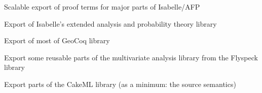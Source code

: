\begin{workpackage}[id=libraries,type=RTD,wphases=1-48,
  short={Large libraries},%
  title={Large libraries},
  lead=Tum,
  StrRM=18,
  ChaRM=12,
  TumRM=27]
\begin{tasklist}
\end{tasklist}

\begin{wpdelivs}
  \begin{wpdeliv}[due=36,id=exportafp,dissem=PU,nature=DEM,lead=Tum]
      {Scalable export of proof terms for major parts of Isabelle/AFP}
  \end{wpdeliv}
  \begin{wpdeliv}[due=36,id=exportanalysis,dissem=PU,nature=DEM,lead=Tum]
      {Export of Isabelle's extended analysis and probability theory library}
  \end{wpdeliv}
  \begin{wpdeliv}[due=18,id=geocoq-import,dissem=PU,nature=OTH,lead=Str]
      {Export of most of GeoCoq library}
  \end{wpdeliv}
  \begin{wpdeliv}[due=36,id=flyspec,dissem=PU,nature=OTH,lead=Inr]
      {Export some reusable parts of the multivariate analysis library from the Flyspeck library}
  \end{wpdeliv}
  \begin{wpdeliv}[due=26,id=cakeml,dissem=PU,nature=DEM,lead=Cha]
      {Export parts of the CakeML library (as a minimum: the source semantics)}
  \end{wpdeliv}
\end{wpdelivs}
\end{workpackage}

